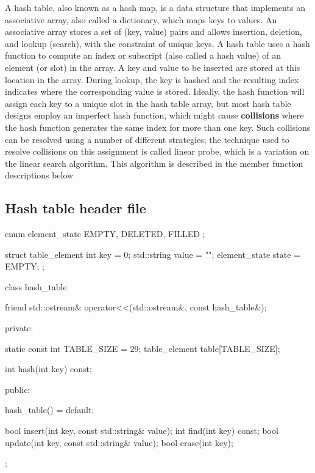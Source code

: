 \documentclass{report}
\begin{document}
     \pagebreak 
    \bigbreak \noindent 
    \begin{concept}
        A hash table, also known as a hash map, is a data structure that implements an associative
        array, also called a dictionary, which maps keys to values. An associative array stores a set of
        (key, value) pairs and allows insertion, deletion, and lookup (search), with the constraint of unique
        keys.
        \bigbreak \noindent 
        A hash table uses a hash function to compute an index or subscript (also called a hash value) of
        an element (or slot) in the array. A key and value to be inserted are stored at this location in the
        array. During lookup, the key is hashed and the resulting index indicates where the corresponding
        value is stored.
        \bigbreak \noindent 
        Ideally, the hash function will assign each key to a unique slot in the hash table array, but most
        hash table designs employ an imperfect hash function, which might cause \textbf{collisions} where the
        hash function generates the same index for more than one key. Such collisions can be resolved
        using a number of different strategies; the technique used to resolve collisions on this assignment
        is called linear probe, which is a variation on the linear search algorithm. This algorithm is
        described in the member function descriptions below
    \end{concept}

    \pagebreak 
    \subsection{Hash table header file}
    \bigbreak \noindent 
    \begin{cppcode}
        enum element_state
        {
            EMPTY, DELETED, FILLED
        };

        struct table_element
        {
            int key = 0;
            std::string value = "";
            element_state state = EMPTY;
        };

        class hash_table
        {
            friend std::ostream& operator<<(std::ostream&, const hash_table&);

            private:

            static const int TABLE_SIZE = 29;
            table_element table[TABLE_SIZE];

            int hash(int key) const;

            public:

            hash_table() = default;

            bool insert(int key, const std::string& value);
            int find(int key) const;
            bool update(int key, const std::string& value);
            bool erase(int key);
        };
    \end{cppcode}
\end{document}
